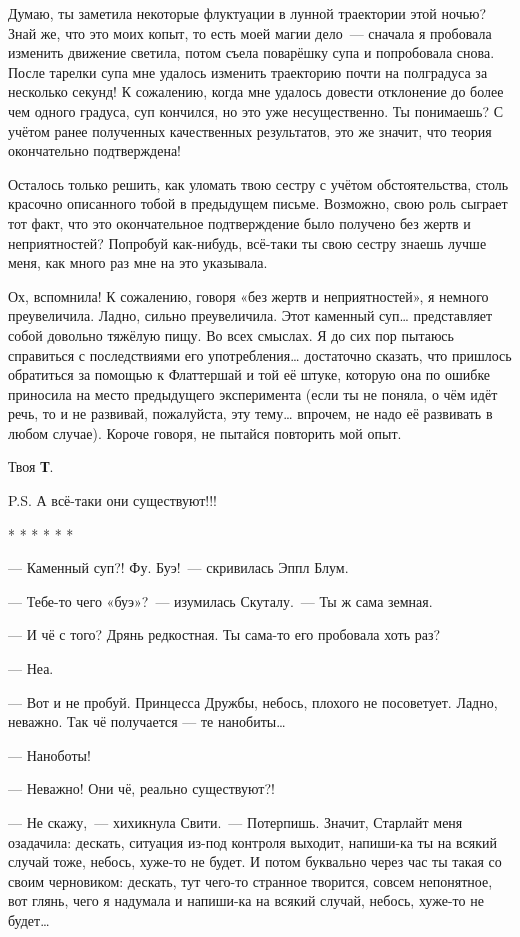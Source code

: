 \documentclass[fontsize=11pt,a5paper,titlepage=firstcover]{scrbook}
\begin{document}
Думаю, ты заметила некоторые флуктуации в лунной траектории этой ночью? Знай же, что это моих копыт, то есть моей магии дело~--- сначала я пробовала изменить движение светила, потом съела поварёшку супа и попробовала снова. После тарелки супа мне удалось изменить траекторию почти на полградуса за несколько секунд! К сожалению, когда мне удалось довести отклонение до более чем одного градуса, суп кончился, но это уже несущественно. Ты понимаешь? С учётом ранее полученных качественных результатов, это же значит, что теория окончательно подтверждена!

Осталось только решить, как уломать твою сестру с учётом обстоятельства, столь красочно описанного тобой в предыдущем письме. Возможно, свою роль сыграет тот факт, что это окончательное подтверждение было получено без жертв и неприятностей? Попробуй как-нибудь, всё-таки ты свою сестру знаешь лучше меня, как много раз мне на это указывала.

Ох, вспомнила! К сожалению, говоря «без жертв и неприятностей», я немного преувеличила. Ладно, сильно преувеличила. Этот каменный суп{\ldots} представляет собой довольно тяжёлую пищу. Во всех смыслах. Я до сих пор пытаюсь справиться с последствиями его употребления{\ldots} достаточно сказать, что пришлось обратиться за помощью к Флаттершай и той её штуке, которую она по ошибке приносила на место предыдущего эксперимента (если ты не поняла, о чём идёт речь, то и не развивай, пожалуйста, эту тему{\ldots} впрочем, не надо её развивать в любом случае). Короче говоря, не пытайся повторить мой опыт.
\begin{flushright}Твоя \textbf{Т}.\end{flushright}
P.S. А всё-таки они существуют!!!
\begin{center}
	* * * * * *
\end{center}

--- Каменный суп?! Фу. Буэ!~--- скривилась Эппл Блум.

--- Тебе-то чего «буэ»?~--- изумилась Скуталу.~--- Ты ж сама земная.

--- И чё с того? Дрянь редкостная. Ты сама-то его пробовала хоть раз?

--- Неа.

--- Вот и не пробуй. Принцесса Дружбы, небось, плохого не посоветует. Ладно, неважно. Так чё получается --- те нанобиты{\ldots}

--- Наноботы!

--- Неважно! Они чё, реально существуют?!

--- Не скажу,~--- хихикнула Свити.~--- Потерпишь. Значит, Старлайт меня озадачила: дескать, ситуация из-под контроля выходит, напиши-ка ты на всякий случай тоже, небось, хуже-то не будет. И потом буквально через час ты такая со своим черновиком: дескать, тут чего-то странное творится, совсем непонятное, вот глянь, чего я надумала и напиши-ка на всякий случай, небось, хуже-то не будет{\ldots}
\end{document}
